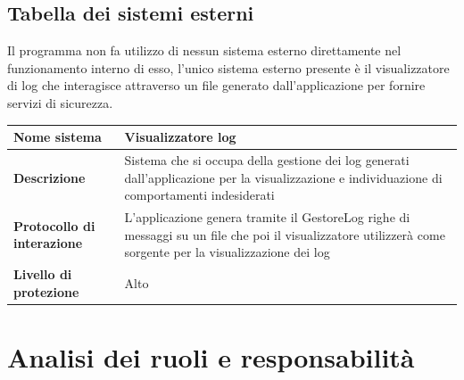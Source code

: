 \documentclass[12pt,a4paper]{report}
\begin{document}
\subsection{Tabella dei sistemi esterni}
Il programma non fa utilizzo di nessun sistema esterno direttamente nel funzionamento interno di esso, l’unico sistema esterno presente è il visualizzatore di log che interagisce attraverso un file generato dall’applicazione per fornire servizi di sicurezza.

\begin{tabularx}{\textwidth}{|X|X|}
    \hline
    \endhead
    \rowcolor{studyColor} \textbf{Nome sistema} & Visualizzatore log \\ \hline
    \textbf{Descrizione} & Sistema che si occupa della gestione dei log generati dall'applicazione per la visualizzazione e individuazione di comportamenti indesiderati \\ \hline
    \textbf{Protocollo di interazione} & L'applicazione genera tramite il GestoreLog righe di messaggi su un file che poi il visualizzatore utilizzerà come sorgente per la visualizzazione dei log \\ \hline
    \textbf{Livello di protezione} & Alto \\ \hline
\end{tabularx}

\newpage
\section{Analisi dei ruoli e responsabilità}
\end{document}
